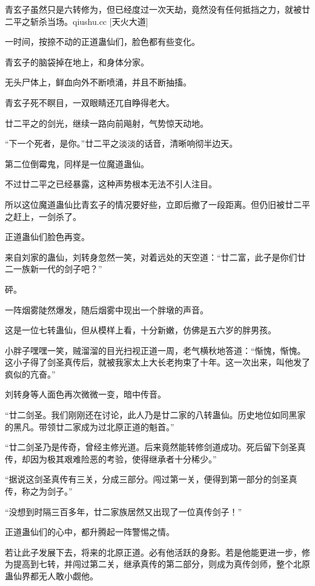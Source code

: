 
\begin{this_body}

青玄子虽然只是六转修为，但已经度过一次天劫，竟然没有任何抵挡之力，就被廿二平之斩杀当场。qiushu.cc [天火大道]

一时间，按捺不动的正道蛊仙们，脸色都有些变化。

青玄子的脑袋掉在地上，和身体分家。

无头尸体上，鲜血向外不断喷涌，并且不断抽搐。

青玄子死不瞑目，一双眼睛还兀自睁得老大。

廿二平之的剑光，继续一路向前飚射，气势惊天动地。

“下一个死者，是你。”廿二平之淡淡的话音，清晰响彻半边天。

第二位倒霉鬼，同样是一位魔道蛊仙。

不过廿二平之已经暴露，这种声势根本无法不引人注目。

所以这位魔道蛊仙比青玄子的情况要好些，立即后撤了一段距离。但仍旧被廿二平之赶上，一剑杀了。

正道蛊仙们脸色再变。

来自刘家的蛊仙，刘转身忽然一笑，对着远处的天空道：“廿二富，此子是你们廿二一族新一代的剑子吧？”

砰。

一阵烟雾陡然爆发，随后烟雾中现出一个胖墩的声音。

这是一位七转蛊仙，但从模样上看，十分新嫩，仿佛是五六岁的胖男孩。

小胖子嘿嘿一笑，贼溜溜的目光扫视正道一周，老气横秋地答道：“惭愧，惭愧。这小子得了剑圣真传后，就被我家太上大长老拘束了十年。这一次出来，叫他发了疯似的亢奋。”

刘转身等人面色再次微微一变，暗中传音。

“廿二剑圣。我们刚刚还在讨论，此人乃是廿二家的八转蛊仙。历史地位如同黑家的黑凡。带领廿二家成为过北原正道的魁首。”

“廿二剑圣乃是传奇，曾经主修光道。后来竟然能转修剑道成功。死后留下剑圣真传，却因为极其艰难险恶的考验，使得继承者十分稀少。”

“据说这剑圣真传有三关，分成三部分。闯过第一关，便得到第一部分的剑圣真传，称之为剑子。”

“没想到时隔三百多年，廿二家族居然又出现了一位真传剑子！”

正道蛊仙们的心中，都升腾起一阵警惕之情。

若让此子发展下去，将来的北原正道。必有他活跃的身影。若是他能更进一步，修为提高到七转，并闯过第二关，继承真传的第二部分，则成为真传剑师，整个北原蛊仙界都无人敢小觑他。


\end{this_body}
